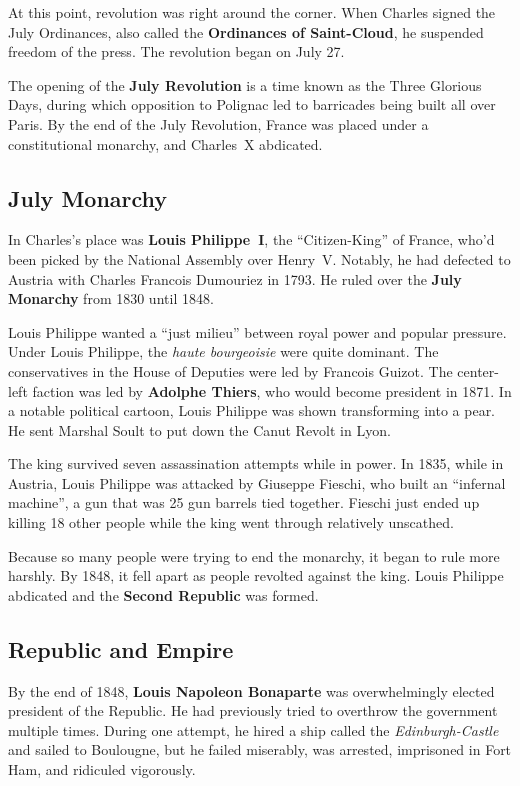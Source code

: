 At this point, revolution was right around the corner.
When Charles signed the July Ordinances, also called the \textbf{Ordinances of Saint-Cloud},
he suspended freedom of the press.
The revolution began on July 27.

The opening of the \textbf{July Revolution} is a time known as the Three Glorious Days,
during which opposition to Polignac led to barricades being built all over Paris.
By the end of the July Revolution, France was placed under a constitutional monarchy, and Charles~X abdicated.

\subsection*{July Monarchy}

In Charles's place was \textbf{Louis Philippe~I}, the ``Citizen-King'' of France,
who'd been picked by the National Assembly over Henry~V.
Notably, he had defected to Austria with Charles Francois Dumouriez in 1793.
He ruled over the \textbf{July Monarchy} from 1830 until 1848.

Louis Philippe wanted a ``just milieu'' between royal power and popular pressure.
Under Louis Philippe, the \textit{haute bourgeoisie} were quite dominant.
The conservatives in the House of Deputies were led by Francois Guizot.
The center-left faction was led by \textbf{Adolphe Thiers}, who would become president in 1871.
In a notable political cartoon, Louis Philippe was shown transforming into a pear.
He sent Marshal Soult to put down the Canut Revolt in Lyon.

The king survived seven assassination attempts while in power.
In 1835, while in Austria, Louis Philippe was attacked by Giuseppe Fieschi, who built an ``infernal machine'',
a gun that was 25 gun barrels tied together.
Fieschi just ended up killing 18 other people while the king went through relatively unscathed.

Because so many people were trying to end the monarchy, it began to rule more harshly.
By 1848, it fell apart as people revolted against the king.
Louis Philippe abdicated and the \textbf{Second Republic} was formed.

\subsection*{Republic and Empire}

By the end of 1848, \textbf{Louis Napoleon Bonaparte} was overwhelmingly elected president of the Republic.
He had previously tried to overthrow the government multiple times.
During one attempt, he hired a ship called the \textit{Edinburgh-Castle} and sailed to Boulougne,
but he failed miserably, was arrested, imprisoned in Fort Ham, and ridiculed vigorously.

